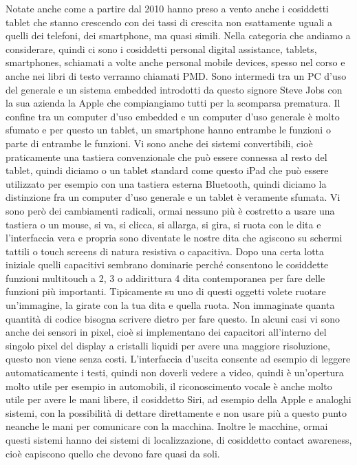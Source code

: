 Notate anche come a partire dal 2010 hanno preso a vento anche i cosiddetti tablet che stanno crescendo con dei tassi di crescita non esattamente uguali a quelli dei telefoni, dei smartphone, ma quasi simili.
Nella categoria che andiamo a considerare, quindi ci sono i cosiddetti personal digital assistance, tablets, smartphones, schiamati a volte anche personal mobile devices, spesso nel corso e anche nei libri di testo verranno chiamati PMD.
Sono intermedi tra un PC d'uso del generale e un sistema embedded introdotti da questo signore Steve Jobs con la sua azienda la Apple che compiangiamo tutti per la scomparsa prematura.
Il confine tra un computer d'uso embedded e un computer d'uso generale è molto sfumato e per questo un tablet, un smartphone hanno entrambe le funzioni o parte di entrambe le funzioni.
Vi sono anche dei sistemi convertibili, cioè praticamente una tastiera convenzionale che può essere connessa al resto del tablet, quindi diciamo o un tablet standard come questo iPad che può essere utilizzato per esempio con una tastiera esterna Bluetooth, quindi diciamo la distinzione fra un computer d'uso generale e un tablet è veramente sfumata.
Vi sono però dei cambiamenti radicali, ormai nessuno più è costretto a usare una tastiera o un mouse, si va, si clicca, si allarga, si gira, si ruota con le dita e l'interfaccia vera e propria sono diventate le nostre dita che agiscono su schermi tattili o touch screens di natura resistiva o capacitiva.
Dopo una certa lotta iniziale quelli capacitivi sembrano dominarie perché consentono le cosiddette funzioni multitouch a 2, 3 o addirittura 4 dita contemporanea per fare delle funzioni più importanti.
Tipicamente su uno di questi oggetti volete ruotare un'immagine, la girate con la tua dita e quella ruota.
Non immaginate quanta quantità di codice bisogna scrivere dietro per fare questo.
In alcuni casi vi sono anche dei sensori in pixel, cioè si implementano dei capacitori all'interno del singolo pixel del display a cristalli liquidi per avere una maggiore risoluzione, questo non viene senza costi.
L'interfaccia d'uscita consente ad esempio di leggere automaticamente i testi, quindi non doverli vedere a video, quindi è un'opertura molto utile per esempio in automobili, il riconoscimento vocale è anche molto utile per avere le mani libere, il cosiddetto Siri, ad esempio della Apple e analoghi sistemi, con la possibilità di dettare direttamente e non usare più a questo punto neanche le mani per comunicare con la macchina.
Inoltre le macchine, ormai questi sistemi hanno dei sistemi di localizzazione, di cosiddetto contact awareness, cioè capiscono quello che devono fare quasi da soli.
